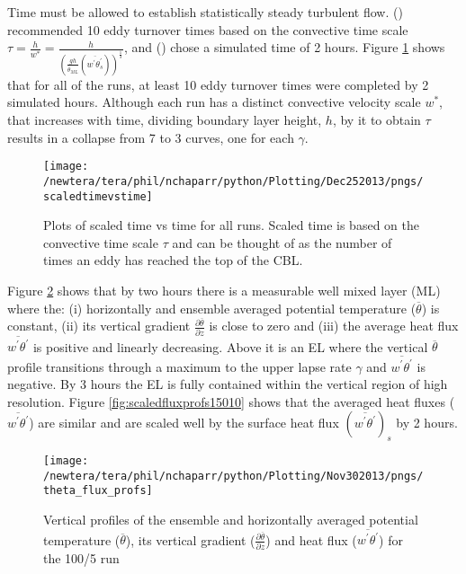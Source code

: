 Time must be allowed to establish statistically steady turbulent flow.  \citeauthor{SullMoengStev} 
(\citeyear{SullMoengStev}) recommended 10 eddy turnover times based on the convective time scale 
$\tau = \frac{h}{w^{*}} = \frac{h}{ \left( \frac{gh}{\overline{\theta}_{ML}}(\overline{w^{'} \theta^{'}_{s}}) \right)^{\frac{1}{3}} } $, 
and \citeauthor{BrooksFowler2} (\citeyear{BrooksFowler2}) chose a simulated time of 2 hours.  Figure \ref{fig:ScaledTimevsTime} shows that for all of 
the runs, at least 10 eddy turnover times were completed by 2 simulated hours.  
Although each run has a distinct convective velocity scale $w^{*}$, that increases with time, 
dividing boundary layer height, $h$, by it to obtain $\tau$ results in a collapse from 7 to 3 curves, 
one for each $\gamma$.\\

\begin{figure}[!h]
    \centering
    \texttt{[image: /newtera/tera/phil/nchaparr/python/Plotting/Dec252013/pngs/scaledtimevstime]}
    \caption[Scaled time vs Time]{Plots of scaled time vs time for all runs.  Scaled time is based on the convective time scale $\tau$ 
    and can be thought of as the number of times an eddy has reached the top of the CBL.}
    \label{fig:ScaledTimevsTime}   
\end{figure}

Figure \ref{fig:tempgradfluxprofs1005} shows that by two hours there is a measurable well mixed layer (\acs{ML}) where the: (i) horizontally and ensemble averaged potential temperature ($\overline{\theta}$) is constant, (ii) its vertical gradient $\frac{\partial \overline{\theta}}{\partial z}$ is close to zero and (iii) the average heat flux $\overline{w^{'}\theta^{'}}$ is positive and linearly decreasing. Above it is an \acs{EL} where the vertical $\overline{\theta}$ profile transitions through a maximum to the upper lapse rate $\gamma$ and $\overline{w^{'}\theta^{'}}$ is negative.  By 3 hours the \acs{EL} is fully contained within the vertical region of high resolution.  Figure \ref{fig:scaledfluxprofs15010} shows that the averaged heat fluxes ($\overline{w^{'}\theta^{'}}$) are similar and are scaled well by the surface heat flux $(\overline{w^{'}\theta^{'}})_{s}$ by 2 hours.\\

\begin{figure}[htbp]
    \centering
    \texttt{[image: /newtera/tera/phil/nchaparr/python/Plotting/Nov302013/pngs/theta\_flux\_profs]}
    \caption[Vertical profiles of $\overline{\theta}$, $\frac{\partial \overline{\theta}}{\partial z}$ and $\overline{w^{'}\theta^{'}}$]{Vertical profiles of the ensemble and horizontally averaged potential temperature ($\overline{\theta}$), its vertical gradient ($\frac{\partial \overline{\theta}}{\partial z}$)  
     and heat flux ($\overline{w^{'}\theta^{'}}$) for the 100/5 run}
    \label{fig:tempgradfluxprofs1005}   %
\end{figure}

